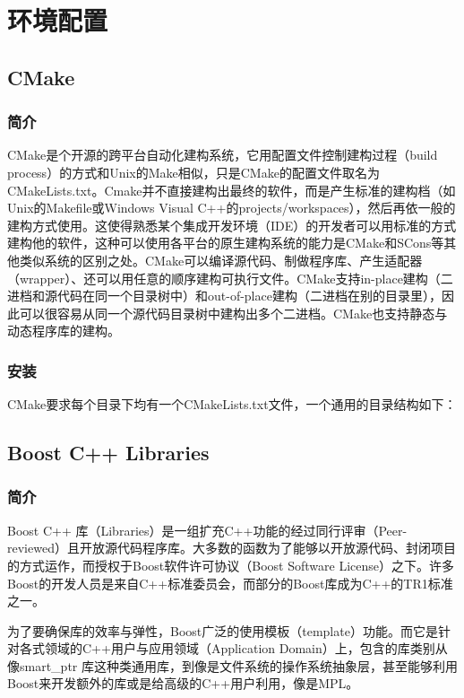 \chapter{环境配置}
\section{CMake}
	\subsection{简介}
	\par CMake是个开源的跨平台自动化建构系统，它用配置文件控制建构过程（build process）的方式和Unix的Make相似，只是CMake的配置文件取名为CMakeLists.txt。Cmake并不直接建构出最终的软件，而是产生标准的建构档（如Unix的Makefile或Windows Visual C++的projects/workspaces），然后再依一般的建构方式使用。这使得熟悉某个集成开发环境（IDE）的开发者可以用标准的方式建构他的软件，这种可以使用各平台的原生建构系统的能力是CMake和SCons等其他类似系统的区别之处。CMake可以编译源代码、制做程序库、产生适配器（wrapper）、还可以用任意的顺序建构可执行文件。CMake支持in-place建构（二进档和源代码在同一个目录树中）和out-of-place建构（二进档在别的目录里），因此可以很容易从同一个源代码目录树中建构出多个二进档。CMake也支持静态与动态程序库的建构。\cite{ wiki:CMake}
	\subsection{安装}
	\par CMake要求每个目录下均有一个CMakeLists.txt文件，一个通用的目录结构如下：
\section{Boost C++ Libraries}
	\subsection{简介}
	\par Boost C++ 库（Libraries）是一组扩充C++功能的经过同行评审（Peer-reviewed）且开放源代码程序库。大多数的函数为了能够以开放源代码、封闭项目的方式运作，而授权于Boost软件许可协议（Boost Software License）之下。许多Boost的开发人员是来自C++标准委员会，而部分的Boost库成为C++的TR1标准之一。
	\par 为了要确保库的效率与弹性，Boost广泛的使用模板（template）功能。而它是针对各式领域的C++用户与应用领域（Application Domain）上，包含的库类别从像smart\_ptr 库这种类通用库，到像是文件系统的操作系统抽象层，甚至能够利用Boost来开发额外的库或是给高级的C++用户利用，像是MPL。\cite{ wiki:Boost}
